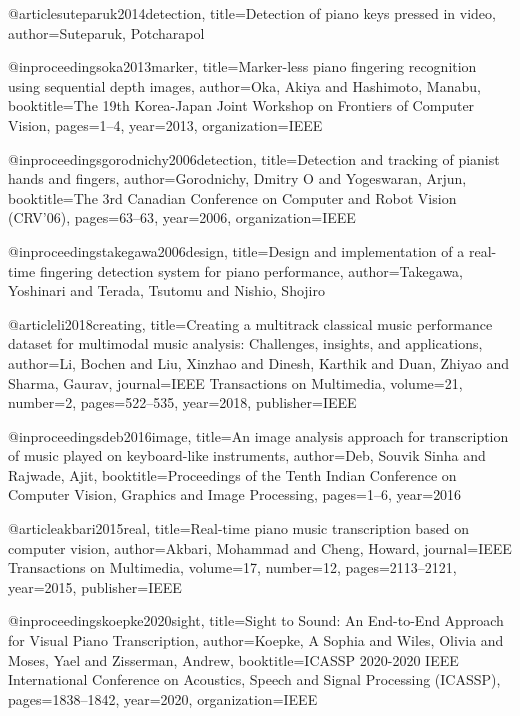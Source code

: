 @article{suteparuk2014detection,
  title={Detection of piano keys pressed in video},
  author={Suteparuk, Potcharapol}
}

@inproceedings{oka2013marker,
  title={Marker-less piano fingering recognition using sequential depth images},
  author={Oka, Akiya and Hashimoto, Manabu},
  booktitle={The 19th Korea-Japan Joint Workshop on Frontiers of Computer Vision},
  pages={1--4},
  year={2013},
  organization={IEEE}
}

@inproceedings{gorodnichy2006detection,
  title={Detection and tracking of pianist hands and fingers},
  author={Gorodnichy, Dmitry O and Yogeswaran, Arjun},
  booktitle={The 3rd Canadian Conference on Computer and Robot Vision (CRV'06)},
  pages={63--63},
  year={2006},
  organization={IEEE}
}

@inproceedings{takegawa2006design,
  title={Design and implementation of a real-time fingering detection system for piano performance},
  author={Takegawa, Yoshinari and Terada, Tsutomu and Nishio, Shojiro}
}

@article{li2018creating,
  title={Creating a multitrack classical music performance dataset for multimodal music analysis: Challenges, insights, and applications},
  author={Li, Bochen and Liu, Xinzhao and Dinesh, Karthik and Duan, Zhiyao and Sharma, Gaurav},
  journal={IEEE Transactions on Multimedia},
  volume={21},
  number={2},
  pages={522--535},
  year={2018},
  publisher={IEEE}
}

@inproceedings{deb2016image,
  title={An image analysis approach for transcription of music played on keyboard-like instruments},
  author={Deb, Souvik Sinha and Rajwade, Ajit},
  booktitle={Proceedings of the Tenth Indian Conference on Computer Vision, Graphics and Image Processing},
  pages={1--6},
  year={2016}
}

@article{akbari2015real,
  title={Real-time piano music transcription based on computer vision},
  author={Akbari, Mohammad and Cheng, Howard},
  journal={IEEE Transactions on Multimedia},
  volume={17},
  number={12},
  pages={2113--2121},
  year={2015},
  publisher={IEEE}
}

@inproceedings{koepke2020sight,
  title={Sight to Sound: An End-to-End Approach for Visual Piano Transcription},
  author={Koepke, A Sophia and Wiles, Olivia and Moses, Yael and Zisserman, Andrew},
  booktitle={ICASSP 2020-2020 IEEE International Conference on Acoustics, Speech and Signal Processing (ICASSP)},
  pages={1838--1842},
  year={2020},
  organization={IEEE}
}


